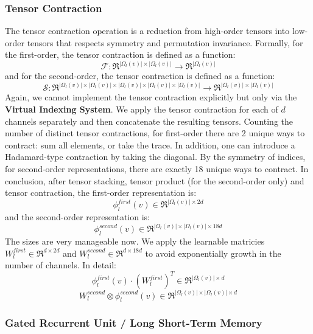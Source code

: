 \documentclass[a4paper]{article}
\begin{document}
\subsubsection{Tensor Contraction}

The tensor contraction operation is a reduction from high-order tensors into low-order tensors that respects symmetry and permutation invariance. Formally, for the first-order, the tensor contraction is defined as a function:
$$\mathcal{F}: \Re^{|\Omega_l(v)| \times |\Omega_l(v)|} \rightarrow \Re^{|\Omega_l(v)|}$$
and for the second-order, the tensor contraction is defined as a function:
$$\mathcal{S}: \Re^{|\Omega_l(v)| \times |\Omega_l(v)| \times|\Omega_l(v)| \times |\Omega_l(v)| \times |\Omega_l(v)|} \rightarrow \Re^{|\Omega_l(v)| \times |\Omega_l(v)|}$$
Again, we cannot implement the tensor contraction explicitly but only via the \textbf{Virtual Indexing System}. We apply the tensor contraction for each of $d$ channels separately and then concatenate the resulting tensors. Counting the number of distinct tensor contractions, for first-order there are 2 unique ways to contract: sum all elements, or take the trace. In addition, one can introduce a Hadamard-type contraction by taking the diagonal. By the symmetry of indices, for second-order representations, there are exactly 18 unique ways to contract. In conclusion, after tensor stacking, tensor product (for the second-order only) and tensor contraction, the first-order representation is:
$$\phi_l^{first}(v) \in \Re^{|\Omega_l(v)| \times 2d}$$
and the second-order representation is:
$$\phi_l^{second}(v) \in \Re^{|\Omega_l(v)| \times |\Omega_l(v)| \times 18d}$$
The sizes are very manageable now. We apply the learnable matricies $W_l^{first} \in \Re^{d \times 2d}$ and $W_l^{second} \in \Re^{d \times 18d}$ to avoid exponentially growth in the number of channels. In detail:
$$\phi_l^{first}(v) \cdot (W_l^{first})^T \in \Re^{|\Omega_l(v)| \times d}$$
$$W_l^{second} \otimes \phi_l^{second}(v) \in \Re^{|\Omega_l(v)| \times |\Omega_l(v)| \times d}$$

\subsubsection{Gated Recurrent Unit / Long Short-Term Memory}
\end{document}

